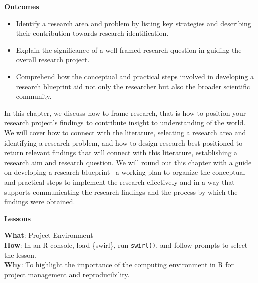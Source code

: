 \documentclass[
  letterpaper,
]{latex/krantz}
\providecommand{\tightlist}{%
  \setlength{\itemsep}{0pt}\setlength{\parskip}{0pt}}\usepackage{longtable,booktabs,array}
\theoremstyle{definition}
\theoremstyle{remark}
\begin{document}
\begin{tcolorbox}[enhanced jigsaw, bottomrule=.15mm, leftrule=.75mm, toprule=.15mm, breakable, colframe=quarto-callout-color-frame, arc=.35mm, left=2mm, rightrule=.15mm, opacityback=0, colback=white]

\textbf{ Outcomes}

\begin{itemize}
\tightlist
\item
  Identify a research area and problem by listing key strategies and
  describing their contribution towards research identification.
\item
  Explain the significance of a well-framed research question in guiding
  the overall research project.
\item
  Comprehend how the conceptual and practical steps involved in
  developing a research blueprint aid not only the researcher but also
  the broader scientific community.
\end{itemize}

\end{tcolorbox}

In this chapter, we discuss how to frame research, that is how to
position your research project's findings to contribute insight to
understanding of the world. We will cover how to connect with the
literature, selecting a research area and identifying a research
problem, and how to design research best positioned to return relevant
findings that will connect with this literature, establishing a research
aim and research question. We will round out this chapter with a guide
on developing a research blueprint --a working plan to organize the
conceptual and practical steps to implement the research effectively and
in a way that supports communicating the research findings and the
process by which the findings were obtained.

\begin{tcolorbox}[enhanced jigsaw, bottomrule=.15mm, leftrule=.75mm, toprule=.15mm, breakable, colframe=quarto-callout-color-frame, arc=.35mm, left=2mm, rightrule=.15mm, opacityback=0, colback=white]

\textbf{ Lessons}

\textbf{What}: Project Environment\\
\textbf{How}: In an R console, load \{swirl\}, run \texttt{swirl()}, and
follow prompts to select the lesson.\\
\textbf{Why}: To highlight the importance of the computing environment
in R for project management and reproducibility.

\end{tcolorbox}
\end{document}
